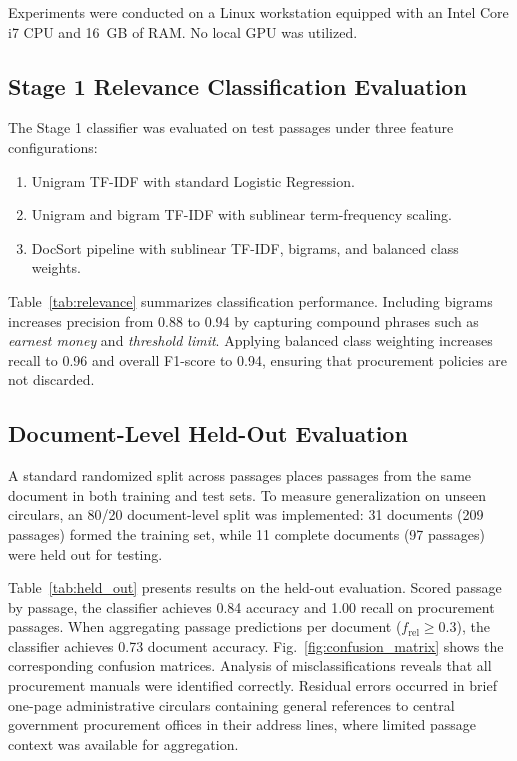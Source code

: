 \documentclass[conference]{IEEEtran}
\begin{document}
Experiments were conducted on a Linux workstation equipped with an Intel Core i7 CPU and 16~GB of RAM. No local GPU was utilized.

\subsection{Stage 1 Relevance Classification Evaluation}
The Stage 1 classifier was evaluated on test passages under three feature configurations:
\begin{enumerate}
    \item Unigram TF-IDF with standard Logistic Regression.
    \item Unigram and bigram TF-IDF with sublinear term-frequency scaling.
    \item DocSort pipeline with sublinear TF-IDF, bigrams, and balanced class weights.
\end{enumerate}

Table~\ref{tab:relevance} summarizes classification performance. Including bigrams increases precision from 0.88 to 0.94 by capturing compound phrases such as \textit{earnest money} and \textit{threshold limit}. Applying balanced class weighting increases recall to 0.96 and overall F1-score to 0.94, ensuring that procurement policies are not discarded.

\subsection{Document-Level Held-Out Evaluation}
A standard randomized split across passages places passages from the same document in both training and test sets. To measure generalization on unseen circulars, an 80/20 document-level split was implemented: 31 documents (209 passages) formed the training set, while 11 complete documents (97 passages) were held out for testing.

Table~\ref{tab:held_out} presents results on the held-out evaluation. Scored passage by passage, the classifier achieves 0.84 accuracy and 1.00 recall on procurement passages. When aggregating passage predictions per document ($f_{\text{rel}} \ge 0.3$), the classifier achieves 0.73 document accuracy. Fig.~\ref{fig:confusion_matrix} shows the corresponding confusion matrices. Analysis of misclassifications reveals that all procurement manuals were identified correctly. Residual errors occurred in brief one-page administrative circulars containing general references to central government procurement offices in their address lines, where limited passage context was available for aggregation.
\end{document}
